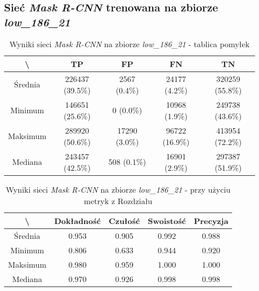 \subsection{Sieć \textit{Mask R-CNN} trenowana na zbiorze \textit{low\_186\_21}}

\begin{table}[H]
  \centering
	\caption{Wyniki sieci \textit{Mask R-CNN} na zbiorze \textit{low\_186\_21} - tablica pomyłek}
	\vspace{6pt}
	{\footnotesize
		\begin{tabular}{|c|c|c|c|c|}
      \hline \textbackslash & TP & FP & FN & TN \\
      \hline Średnia & 226437 (39.5\%) & 2567 (0.4\%) & 24177 (4.2\%) & 320259 (55.8\%) \\
      \hline Minimum & 146651 (25.6\%) & 0 (0.0\%) & 10968 (1.9\%) & 249738 (43.6\%) \\
      \hline Maksimum & 289920 (50.6\%) & 17290 (3.0\%) & 96722 (16.9\%) & 413954 (72.2\%) \\
      \hline Mediana & 243457 (42.5\%) & 508 (0.1\%) & 16901 (2.9\%) & 297387 (51.9\%) \\
      \hline
		\end{tabular}
	}
  \vspace{0pt}
  \label{Tab:low_original}
\end{table}


\begin{table}[H]
	\centering
	\caption{Wyniki sieci \textit{Mask R-CNN} na zbiorze \textit{low\_186\_21} - przy użyciu metryk z Rozdziału }
	\vspace{6pt}
	{\footnotesize
		\begin{tabular}{|c|c|c|c|c|}
      \hline \textbackslash & Dokładność & Czułość & Swoistość & Precyzja \\
      \hline Średnia & 0.953 & 0.905 & 0.992 & 0.988 \\
      \hline Minimum & 0.806 & 0.633 & 0.944 & 0.920 \\
      \hline Maksimum & 0.980 & 0.959 & 1.000 & 1.000 \\
      \hline Mediana & 0.970 & 0.926 & 0.998 & 0.998 \\
      \hline
		\end{tabular}
	}
  \vspace{0pt}
  \label{Tab:low_original_calculated}
\end{table}

